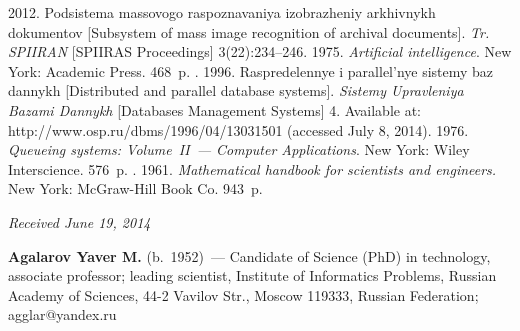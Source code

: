 \begin{multicols}{2}
{{\begin{thebibliography}{99}
 2012. Podsistema massovogo raspoznavaniya izobrazheniy
arkhivnykh dokumentov [Subsystem of mass image recognition of archival documents].
\textit{Tr. SPIIRAN} [SPIIRAS Proceedings] 3(22):234--246.
 1975. \textit{Artificial intelligence}.
New York: Academic Press. 468~p.
. 1996.
Raspredelennye i parallel'nye sistemy baz dannykh
[Distributed and parallel database systems].
\textit{Sistemy Upravleniya Bazami Dannykh} [Databases Management Systems] 4.
Available at: {\sf http://www.osp.ru/dbms/1996/04/13031501}
(accessed July 8, 2014).
 1976. \textit{Queueing systems: Volume~II~---
Computer Applications}. New York: Wiley Interscience. 576~p.
. 1961. \textit{Mathematical
handbook for scientists and engineers.} New York: McGraw-Hill Book Co. 943~p.


\end{thebibliography}

 }
 }

\end{multicols}

\vspace*{-6pt}

\hfill{\small\textit{Received June 19, 2014}}

\vspace*{-18pt}

\Contrl

  \noindent
  \textbf{Agalarov Yaver M.} (b.\ 1952)~--- Candidate of Science (PhD) in
technology, associate professor; leading scientist,
Institute of Informatics Problems, Russian
Academy of Sciences, 44-2 Vavilov Str., Moscow 119333, Russian Federation;  agglar@yandex.ru


\label{end\stat}

\renewcommand{\bibname}{\protect\rm Литература}